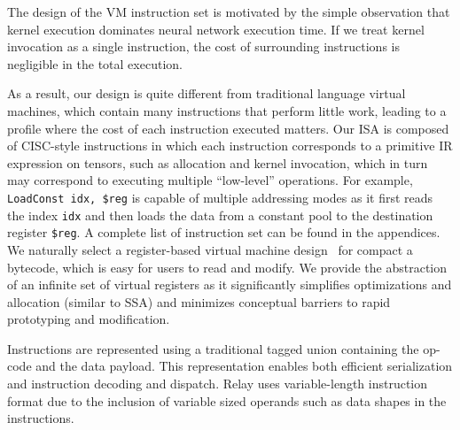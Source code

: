 The design of the VM instruction set is motivated by the simple observation that kernel execution dominates neural network execution time. If we treat kernel invocation as a single instruction, the cost of surrounding instructions is negligible in the total execution.

As a result, our design is quite different from traditional language virtual machines, which contain many instructions that perform little work, leading to a profile where the cost of each instruction executed matters.
Our ISA is composed of CISC-style instructions in which each instruction corresponds to a primitive IR expression on tensors, such as allocation and kernel invocation, which in turn may correspond to executing multiple ``low-level'' operations. For example, \texttt{LoadConst idx, \$reg} is capable of multiple addressing modes as it first reads the index \texttt{idx} and then loads the data from a constant pool to the destination register \texttt{\$reg}.
A complete list of instruction set can be found in the appendices.
We naturally select a register-based virtual machine design~\citep{davis2003case} for compact a bytecode, which is easy for users to read and modify. We provide the abstraction of an infinite set of virtual registers as it significantly simplifies optimizations and allocation (similar to SSA) and minimizes conceptual barriers to rapid prototyping and modification.

Instructions are represented using a traditional tagged union containing the op-code and the data payload. This representation enables both efficient serialization and instruction decoding and dispatch. Relay uses variable-length instruction format due to the inclusion of variable sized operands such as data shapes in the instructions.

\begin{comment}
\begin{table*}[t]
\centering
\small

\caption{The opcode and the description of the Relay instruction set \label{tab:isa}}
\end{table*}
\end{comment}


